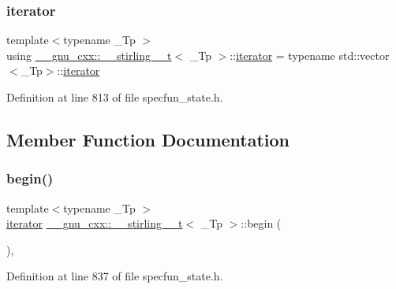 \subsubsection{\texorpdfstring{iterator}{iterator}}
{\footnotesize\ttfamily template$<$typename \+\_\+\+Tp $>$ \\
using \hyperlink{struct____gnu__cxx_1_1____stirling__1__t}{\+\_\+\+\_\+gnu\+\_\+cxx\+::\+\_\+\+\_\+stirling\+\_\+\_\+t}$<$ \+\_\+\+Tp $>$\+::\hyperlink{struct____gnu__cxx_1_1____stirling__1__t_a4dad153706e77f66c38d2a620230ac35}{iterator} =  typename std\+::vector$<$\+\_\+\+Tp$>$\+::\hyperlink{struct____gnu__cxx_1_1____stirling__1__t_a4dad153706e77f66c38d2a620230ac35}{iterator}}



Definition at line 813 of file specfun\+\_\+state.\+h.



\subsection{Member Function Documentation}
\mbox{\label{struct____gnu__cxx_1_1____stirling__1__t_a9ad82f8b4da558a56d79e6ba82eb0ac6}} 
\subsubsection{\texorpdfstring{begin()}{begin()}\hspace{0.1cm}{\footnotesize\ttfamily [1/2]}}
{\footnotesize\ttfamily template$<$typename \+\_\+\+Tp $>$ \\
\hyperlink{struct____gnu__cxx_1_1____stirling__1__t_a4dad153706e77f66c38d2a620230ac35}{iterator} \hyperlink{struct____gnu__cxx_1_1____stirling__1__t}{\+\_\+\+\_\+gnu\+\_\+cxx\+::\+\_\+\+\_\+stirling\+\_\+\_\+t}$<$ \+\_\+\+Tp $>$\+::begin (\begin{DoxyParamCaption}{ }\end{DoxyParamCaption})\hspace{0.3cm}{\ttfamily [inline]}, {\ttfamily [noexcept]}}



Definition at line 837 of file specfun\+\_\+state.\+h.

